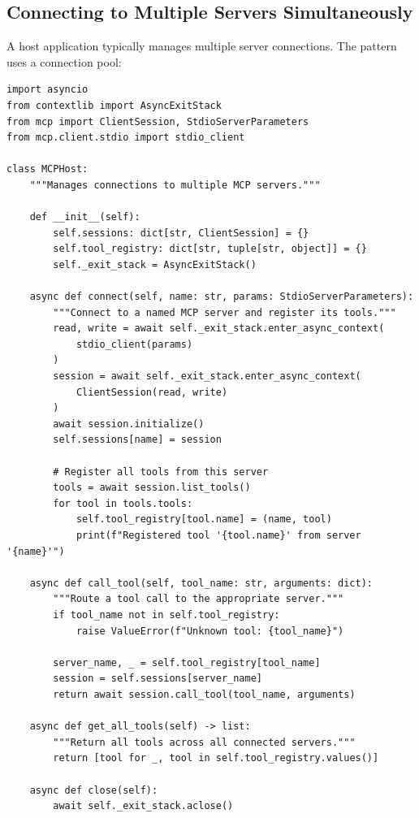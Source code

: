 \subsection{Connecting to Multiple Servers Simultaneously}
\label{connecting-to-multiple-servers-simultaneously}

A host application typically manages multiple server connections. The pattern uses a connection pool:

\begin{lstlisting}[style=pythonstyle, caption={Multi-Server MCP Host Pattern}]
import asyncio
from contextlib import AsyncExitStack
from mcp import ClientSession, StdioServerParameters
from mcp.client.stdio import stdio_client

class MCPHost:
    """Manages connections to multiple MCP servers."""

    def __init__(self):
        self.sessions: dict[str, ClientSession] = {}
        self.tool_registry: dict[str, tuple[str, object]] = {}
        self._exit_stack = AsyncExitStack()

    async def connect(self, name: str, params: StdioServerParameters):
        """Connect to a named MCP server and register its tools."""
        read, write = await self._exit_stack.enter_async_context(
            stdio_client(params)
        )
        session = await self._exit_stack.enter_async_context(
            ClientSession(read, write)
        )
        await session.initialize()
        self.sessions[name] = session

        # Register all tools from this server
        tools = await session.list_tools()
        for tool in tools.tools:
            self.tool_registry[tool.name] = (name, tool)
            print(f"Registered tool '{tool.name}' from server '{name}'")

    async def call_tool(self, tool_name: str, arguments: dict):
        """Route a tool call to the appropriate server."""
        if tool_name not in self.tool_registry:
            raise ValueError(f"Unknown tool: {tool_name}")

        server_name, _ = self.tool_registry[tool_name]
        session = self.sessions[server_name]
        return await session.call_tool(tool_name, arguments)

    async def get_all_tools(self) -> list:
        """Return all tools across all connected servers."""
        return [tool for _, tool in self.tool_registry.values()]

    async def close(self):
        await self._exit_stack.aclose()


\end{lstlisting}
